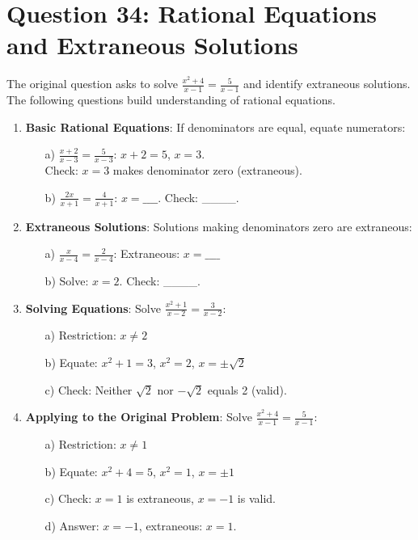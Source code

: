 \documentclass[12pt]{article}
\begin{document}
\section*{Question 34: Rational Equations and Extraneous Solutions}
The original question asks to solve \( \frac{x^2 + 4}{x - 1} = \frac{5}{x - 1} \) and identify extraneous solutions. The following questions build understanding of rational equations.

\begin{enumerate}[label=34.\arabic*]
    \item \textbf{Basic Rational Equations}: If denominators are equal, equate numerators:
    \begin{enumerate}
        \item[a)] \( \frac{x + 2}{x - 3} = \frac{5}{x - 3} \): \( x + 2 = 5 \), \( x = 3 \). \\
        Check: \( x = 3 \) makes denominator zero (extraneous).
        \item[b)] \( \frac{2x}{x + 1} = \frac{4}{x + 1} \): \( x = \_\_\_\_ \). Check: \_\_\_\_.
    \end{enumerate}
    \item \textbf{Extraneous Solutions}: Solutions making denominators zero are extraneous:
    \begin{enumerate}
        \item[a)] \( \frac{x}{x - 4} = \frac{2}{x - 4} \): Extraneous: \( x = \_\_\_\_ \)
        \item[b)] Solve: \( x = 2 \). Check: \_\_\_\_.
    \end{enumerate}
    \item \textbf{Solving Equations}: Solve \( \frac{x^2 + 1}{x - 2} = \frac{3}{x - 2} \):
    \begin{enumerate}
        \item[a)] Restriction: \( x \neq 2 \)
        \item[b)] Equate: \( x^2 + 1 = 3 \), \( x^2 = 2 \), \( x = \pm \sqrt{2} \)
        \item[c)] Check: Neither \( \sqrt{2} \) nor \( -\sqrt{2} \) equals 2 (valid).
    \end{enumerate}
    \item \textbf{Applying to the Original Problem}: Solve \( \frac{x^2 + 4}{x - 1} = \frac{5}{x - 1} \):
    \begin{enumerate}
        \item[a)] Restriction: \( x \neq 1 \)
        \item[b)] Equate: \( x^2 + 4 = 5 \), \( x^2 = 1 \), \( x = \pm 1 \)
        \item[c)] Check: \( x = 1 \) is extraneous, \( x = -1 \) is valid.
        \item[d)] Answer: \( x = -1 \), extraneous: \( x = 1 \).
    \end{enumerate}
\end{enumerate}
\end{document}
